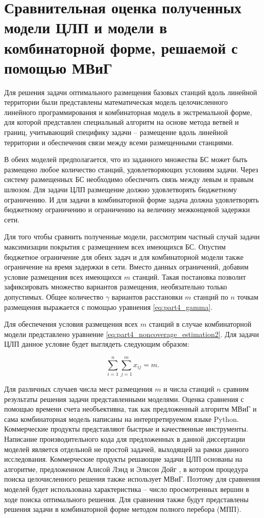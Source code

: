 \section{Сравнительная оценка полученных модели ЦЛП и модели в комбинаторной форме, решаемой с помощью МВиГ}
Для решения задачи оптимального размещения базовых станций вдоль линейной территории были представлены математическая модель целочисленного линейного программирования и комбинаторная модель в экстремальной форме, для которой представлен специальный алгоритм на основе метода ветвей и границ, учитывающий специфику задачи -- размещение вдоль линейной территории и обеспечения связи между всеми размещенными станциями.

В обеих моделей предполагается, что из заданного множества БС может быть размещено любое количество станций, удовлетворяющих условиям задачи. Через систему размещенных БС необходимо обеспечить связь между левым и правым шлюзом. Для задачи ЦЛП размещение должно удовлетворять бюджетному ограничению. И для задачи в комбинаторной форме задача должна удовлетворять бюджетному ограничению и ограничению на величину межконцевой задержки сети.

Для того чтобы сравнить полученные модели, рассмотрим частный случай задачи максимизации покрытия с размещением всех имеющихся БС. Опустим бюджетное ограничение для обеих задач и для комбинаторной модели также ограничение на время задержки в сети. Вместо данных ограничений, добавим условие размещения всех имеющихся $m$ станций. Такая постановка позволит зафиксировать множество вариантов размещения, необязательно только допустимых. Общее количество $\gamma$ вариантов расстановки $m$ станций по $n$ точкам размещения выражается с помощью уравнения \cref{eq:part4_gamma}.


Для обеспечения условия размещения всех $m$ станций в случае комбинаторной модели представлено уравнение \cref{eq:part4_noncoverage_estimation2}. Для задачи ЦЛП данное условие будет выглядеть следующим образом:


\begin{equation}
  \label{eq:part3_placed_all_station}
  \sum\limits_{i=1}^n \sum\limits_{j=1}^m x_{ij} = m.
\end{equation}

Для различных случаев числа мест размещения $m$ и числа станций $n$ сравним результаты решения задачи представленными моделями. Оценка сравнения с помощью времени счета необъективна, так как предложенный алгоритм МВиГ и сама комбинаторная модель написаны на интерпретируемом языке Python. Коммерческие продукты представляют быстрые и качественные инструменты. Написание производительного кода для предложенных в данной диссертации моделей является отдельной не простой задачей, выходящей за рамки данного исследования. Коммерческие продукты решающие задачи ЦЛП основаны на алгоритме, предложенном Алисой Лэнд и Элисон Дойг \cite{Land1960}, в котором процедура поиска целочисленного решения также использует МВиГ.  Поэтому для сравнения моделей будет использована характеристика -- число просмотренных вершин в ходе поиска оптимального решения. Для сравнения также будут представлены решения задачи в комбинаторной форме методом полного перебора (МПП).

